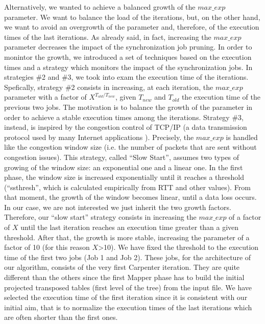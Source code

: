 Alternatively, we wanted to achieve a balanced growth of the $max\_exp$ parameter. We want to balance the load of the iterations, but, on the other hand, we want to avoid an overgrowth of the parameter and, therefore, of the execution times of the last iterations. As already said, in fact, increasing the $max\_exp$ parameter decreases the impact of the synchronization job pruning.
In order to monintor the growth, we introduced a set of techniques based on the execution times and a strategy which monitors the impact of the synchronization jobs.
In strategies \#2 and \#3, we took into exam the execution time of the iterations.
Spefically, strategy \#2 consists in increasing, at each iteration, the $max\_exp$ parameter with a factor of  $X^{T_{old} / T_{new}}$, given $T_{new}$ and  $T_{old}$ the execution time of the previous two jobs. The motivation is to balance the growth of the parameter in order to achieve a stable execution times among the iterations.  
Strategy \#3, instead, is inspired by the congestion control of TCP/IP (a data transmission protocol used by many Internet applications \cite{}). Precisely, the $max\_exp$ is handled like the congestion window size (i.e. the number of packets that are sent without congestion issues).
This strategy, called ``Slow Start'', assumes two types of growing of the window size: an exponential one and a linear one. In the first phase, the window size is increased exponentially until it reaches a threshold (``ssthresh'', which is calculated empirically from RTT and other values). From that moment, the growth of the window becomes linear, until a data loss occurs.
In our case, we are not interested we just inherit the two growth factors. Therefore, our ``slow start'' strategy consists in increasing the $max\_exp$ of a factor of $X$ until the last iteration reaches an execution time greater than a given threshold. After that, the growth is more stable, increasing the parameter of a factor of 10 (for this reason $X$>10).
We have fixed the threshold to the execution time of the first two jobs (Job 1 and Job 2). These jobs, for the architecture of our algorithm, consists of the very first Carpenter iteration. They are quite different than the others since the first Mapper phase has to build the initial projected transposed tables (first level of the tree) from the input file. 
We have selected the execution time of the first iteration since it is consistent with our initial aim,
that is to normalize the execution times of the last iterations which are often shorter than the first ones.

